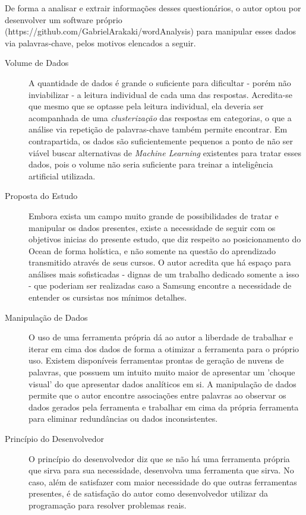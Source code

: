 De forma a analisar e extrair informações desses questionários, o autor optou por desenvolver um software próprio (https://github.com/GabrielArakaki/wordAnalysis) para manipular esses dados via palavras-chave, pelos motivos elencados a seguir.

\begin{description}
\item [Volume de Dados] A quantidade de dados é grande o suficiente para dificultar - porém não inviabilizar - a leitura individual de cada uma das respostas. Acredita-se que mesmo que se optasse pela leitura individual, ela deveria ser acompanhada de uma \textit{clusterização} das respostas em categorias, o que a análise via repetição de palavras-chave também permite encontrar. Em contrapartida, os dados são suficientemente pequenos a ponto de não ser viável buscar alternativas  de \textit{Machine Learning} existentes para tratar esses dados, pois o volume não seria suficiente para treinar a inteligência artificial utilizada.

\item [Proposta do Estudo] Embora exista um campo muito grande de possibilidades de tratar e manipular os dados presentes, existe a necessidade de seguir com os objetivos inicias do presente estudo, que diz respeito ao posicionamento do Ocean de forma holística, e não somente na questão do aprendizado transmitido através de seus cursos. O autor acredita que há espaço para análises mais sofisticadas - dignas de um trabalho dedicado somente a isso - que poderiam ser realizadas caso a Samsung encontre a necessidade de entender os cursistas nos mínimos detalhes.

\item [Manipulação de Dados] O uso de uma ferramenta própria dá ao autor a liberdade de trabalhar e iterar em cima dos dados de forma a otimizar a ferramenta para o próprio uso. Existem disponíveis ferramentas prontas de geração de nuvens de palavras, que possuem um intuito muito maior de apresentar um 'choque visual' do que apresentar dados analíticos em si. A manipulação de dados permite que o autor encontre associações entre palavras ao observar os dados gerados pela ferramenta e trabalhar em cima da própria ferramenta para eliminar redundâncias ou dados inconsistentes.

\item [Princípio do Desenvolvedor] O princípio do desenvolvedor diz que se não há uma ferramenta própria que sirva para sua necessidade, desenvolva uma ferramenta que sirva. No caso, além de satisfazer com maior necessidade do que outras ferramentas presentes, é de satisfação do autor como desenvolvedor utilizar da programação para resolver problemas reais.
 
\end{description}

